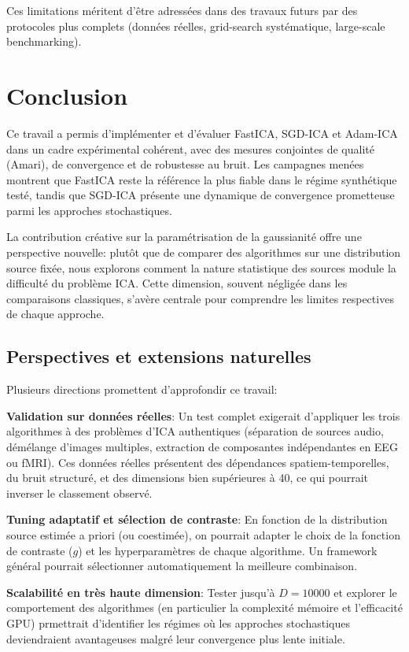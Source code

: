 \documentclass[11pt,a4paper]{article}
\begin{document}
Ces limitations méritent d'être adressées dans des travaux futurs par des protocoles plus complets (données réelles, grid-search systématique, large-scale benchmarking).

\section{Conclusion}

Ce travail a permis d'implémenter et d'évaluer FastICA, SGD-ICA et Adam-ICA dans un cadre expérimental cohérent, avec des mesures conjointes de qualité (Amari), de convergence et de robustesse au bruit. Les campagnes menées montrent que FastICA reste la référence la plus fiable dans le régime synthétique testé, tandis que SGD-ICA présente une dynamique de convergence prometteuse parmi les approches stochastiques.

La contribution créative sur la paramétrisation de la gaussianité offre une perspective nouvelle: plutôt que de comparer des algorithmes sur une distribution source fixée, nous explorons comment la nature statistique des sources module la difficulté du problème ICA. Cette dimension, souvent négligée dans les comparaisons classiques, s'avère centrale pour comprendre les limites respectives de chaque approche.

\subsection{Perspectives et extensions naturelles}

Plusieurs directions promettent d'approfondir ce travail:

\textbf{Validation sur données réelles}: Un test complet exigerait d'appliquer les trois algorithmes à des problèmes d'ICA authentiques (séparation de sources audio, démélange d'images multiples, extraction de composantes indépendantes en EEG ou fMRI). Ces données réelles présentent des dépendances spatiem-temporelles, du bruit structuré, et des dimensions bien supérieures à 40, ce qui pourrait inverser le classement observé.

\textbf{Tuning adaptatif et sélection de contraste}: En fonction de la distribution source estimée a priori (ou coestimée), on pourrait adapter le choix de la fonction de contraste ($g$) et les hyperparamètres de chaque algorithme. Un framework général pourrait sélectionner automatiquement la meilleure combinaison.

\textbf{Scalabilité en très haute dimension}: Tester jusqu'à $D = 10000$ et explorer le comportement des algorithmes (en particulier la complexité mémoire et l'efficacité GPU) prmettrait d'identifier les régimes où les approches stochastiques deviendraient avantageuses malgré leur convergence plus lente initiale.
\end{document}
